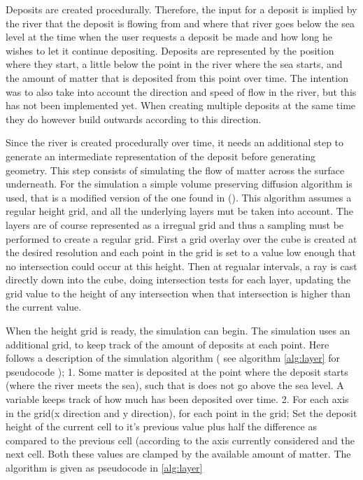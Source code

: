\documentclass[a4paper,12pt]{report}
\begin{document}
Deposits are created procedurally. Therefore, the input for a deposit is implied by the river that the deposit is flowing from and where that river goes below the sea level at the time when the user requests a deposit be made and how long he wishes to let it continue depositing. Deposits are represented by the position where they start, a little below the point in the river where the sea starts, and the amount of matter that is deposited from this point over time. The intention was to also take into account the direction and speed of flow in the river, but this has not been implemented yet. When creating multiple deposits at the same time they do however build outwards according to this direction.

Since the river is created procedurally over time, it needs an additional step to generate an intermediate representation of the deposit before generating geometry. This step consists of simulating the flow of matter across the surface underneath. For the simulation a simple volume preserving diffusion algorithm is used, that is a modified version of the one found in (\cite{Boesch:2011:Online}). This algorithm assumes a regular height grid, and all the underlying layers mut be taken into account. The layers are of course represented as a irregual grid and thus a sampling must be performed to create a regular grid. First a grid overlay over the cube is created at the desired resolution and each point in the grid is set to a value low enough that no intersection could occur at this height. Then at regualar intervals, a ray is cast directly down into the cube, doing intersection tests for each layer, updating the grid value to the height of any intersection when that intersection is higher than the 
current value.

When the height grid is ready, the simulation can begin. The simulation uses an additional grid, to keep track of the amount of deposits at each point. Here follows a description of the simulation algorithm ( see algorithm \ref{alg:layer} for pseudocode );
1. Some matter is deposited at the point where the deposit starts (where the river meets the sea), such that is does not go above the sea level. A variable keeps track of how much has been deposited over time.
2. For each axis in the grid(x direction and y direction), for each point in the grid;
Set the deposit height of the current cell to it's previous value plus half the difference as compared to the previous cell (according to the axis currently considered and the next cell. Both these values are clamped by the available amount of matter. The algorithm is given as pseudocode in \ref{alg:layer}
\end{document}
